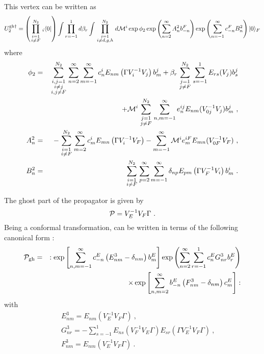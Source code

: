 \documentclass[a4paper,11pt]{article}
\begin{document}
This vertex can be written as
\begin{equation}
U^{{\rm gh}\dagger }_2 = \left( \prod_{\scriptstyle i=1\atop \scriptstyle i\neq F}^{N_2}{ }_i\langle 0|\right) \int \prod_{r=-1}^1d\beta _r\int \prod_{\scriptstyle i=1\atop \scriptstyle i\neq d,g,h}^{N_2}d{\cal M}^i \exp {\phi _2}\exp \left( \sum_{n=2}^\infty A_n^2b_{-n}^F\right) \exp \left( \sum_{n=-1}^\infty c_{-n}^FB_n^2\right) |0\rangle _F
\end{equation}
where
\begin{eqnarray}
\phi _2 & = & \sum_{{\scriptstyle i,j=1\atop \scriptstyle i\neq j}\atop \scriptstyle i,j\neq F}^{N_2}\sum_{n=2}^\infty \sum_{m=-1}^\infty c_n^iE_{nm}\left( \Gamma V^{-1}_iV_j\right) b_m^j +\beta _r\sum_{\scriptstyle j=1\atop \scriptstyle j\neq F}^{N_2}\sum_{s=-1}^1E_{rs}(V_j)b_s^j\nonumber \\
 & & +{\cal M}^i\sum_{\scriptstyle j=1\atop \scriptstyle j\neq F}^{N_2}\sum_{n,m=-1}^\infty e_n^{ij}E_{nm}(V_{0j}^{-1}V_j)b_m^j\ ,\\
A_n^2 & = & -\sum_{\scriptstyle i=1\atop \scriptstyle i\neq F}^{N_2}\sum_{m=2}^\infty c_m^iE_{mn}\left( \Gamma V^{-1}_iV_F\right) -\sum_{m=-1}^\infty {\cal M}^ie_m^{iF}E_{mn}(V_{0F}^{-1}V_F)\ ,\\ 
B_n^2 & = & \sum_{\scriptstyle i=1\atop \scriptstyle i\neq F}^{N_2}\sum_{p=2}^\infty \sum_{m=-1}^\infty \delta_{np}E_{pm}\left( \Gamma V^{-1}_FV_i\right) b_m^i\ .
\end{eqnarray}

The ghost part of the propagator is given by
\begin{equation}
{\cal P}=V_E^{-1}V_F\Gamma \ .
\end{equation}
Being a conformal transformation, can be written in terms of the following canonical form \cite{cg2}:
\begin{eqnarray}
{\cal P}_{\rm gh} & = & :\exp \left[ \sum_{n,m=-1}^\infty c_{-n}^E\left( E_{nm}^3-\delta _{nm}\right) b_m^E\right] \exp \left( \sum_{n=2}^\infty \sum_{r=-1}^1c_n^EG_{nr}^3b_r^E\right) \nonumber \\ 
 & & \times \exp \left[ \sum_{n,m=2}^\infty b_{-n}^E\left( F_{nm}^3-\delta _{nm}\right) c_m^E\right] :
\end{eqnarray}
with
\begin{eqnarray}
 & & E_{nm}^3 = E_{nm}\left( V_E^{-1} V_F\Gamma \right) \ ,\\ 
 & & G_{nr}^3 = -\sum_{s=-1}^1 E_{ns} \left( V_F^{-1} V_E\Gamma \right) E_{sr}\left( \Gamma V_E^{-1} V_F\Gamma \right) \ ,\\ 
 & & F_{nm}^3 = E_{nm}\left( V_E^{-1} V_F\Gamma \right) \ .
\end{eqnarray}
\end{document}
